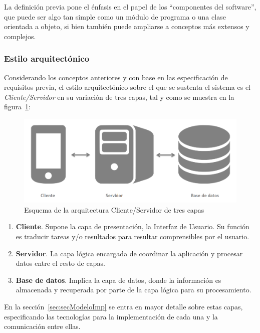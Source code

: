 La definición previa pone el énfasis en el papel de los ``componentes del software'', que puede ser algo tan simple como un módulo de programa o una clase orientada a objeto, si bien también puede ampliarse a conceptos más extensos y complejos.

\subsubsection{Estilo arquitectónico}

Considerando los conceptos anteriores y con base en las especificación de requisitos previa, el estilo arquitectónico sobre el que se sustenta el sistema es el \emph{Cliente/Servidor} en su variación de tres capas, tal y como se muestra en la figura~\ref{fig:arqClienteServ3Cap}:

\begin{figure}
	\centering
	\includegraphics[width=\linewidth,height=\textheight,keepaspectratio]{Images/ArqClienteServ3Cap}
	\caption{Esquema de la arquitectura Cliente/Servidor de tres capas}
	\label{fig:arqClienteServ3Cap}
\end{figure}

\begin{enumerate}
	\item \textbf{Cliente}. Supone la capa de presentación, la Interfaz de Usuario. Su función es traducir tareas y/o resultados para resultar comprensibles por el usuario.
	\item \textbf{Servidor}. La capa lógica encargada de coordinar la aplicación y procesar datos entre el resto de capas.
	\item \textbf{Base de datos}. Implica la capa de datos, donde la información es almacenada y recuperada por parte de la capa lógica para su procesamiento.
\end{enumerate}

En la sección~\ref{sec:secModeloImp} se entra en mayor detalle sobre estas capas, especificando las tecnologías para la implementación de cada una y la comunicación entre ellas.

